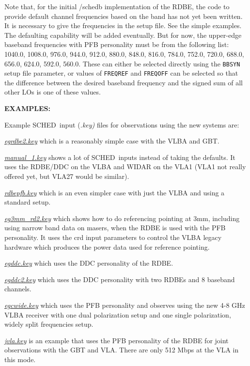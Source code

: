 \documentclass{report}
\newcommand{\schedb}{{\sc SCHED~}}
\begin{document}
Note that, for the initial /schedb implementation of the RDBE, the
code to provide default channel frequencies based on the band has not
yet been written.  It is necessary to give the frequencies in the
setup file.  See the simple examples.  The defaulting capability will
be added eventually.  But for now, the upper-edge baseband frequencies
with PFB personality must be from the following list: 1040.0, 1008.0,
976.0, 944.0, 912.0, 880.0, 848.0, 816.0, 784.0, 752.0, 720.0, 688.0,
656.0, 624.0, 592.0, 560.0.  These can either be selected directly
using the {\tt BBSYN} setup file parameter, or values of {\tt FREQREF}
and {\tt FREQOFF} can be selected so that the difference between the
desired baseband frequency and the signed sum of all other LOs is one
of these values.

{\bf EXAMPLES:}

Example \schedb input {(\sl .key)} files for observations using the
new systems are: 

{\href{examples/egrdbe2.key}{{\sl egrdbe2.key}}} which is
a reasonably simple case with the VLBA and GBT.

{\href{examples/manual\_1.key}{{\sl manual\_1.key}}} shows
a lot of \schedb inputs instead of taking the defaults.  It uses
the RDBE/DDC on the VLBA and WIDAR on the VLA1 (VLA1 not really offered
yet, but VLA27 would be similar).

{\href{examples/rdbepfb.key}{{\sl rdbepfb.key}}} which is
an even simpler case with just the VLBA and using a standard setup.

{\href{examples/eg3mm\_rd2.key}{{\sl eg3mm\_rd2.key}}} which
shows how to do referencing pointing at 3mm, including using narrow
band data on masers, when the RDBE is used with the PFB personality.
It uses the crd input parameters to control the VLBA legacy hardware
which produces the power data used for reference pointing.

{\href{examples/egddc.key}{{\sl egddc.key}}} which uses the
DDC personality of the RDBE.

{\href{examples/egddc2.key}{{\sl egddc2.key}}} which uses the
DDC personality with two RDBEs and 8 baseband channels.

{\href{examples/egcwide.key}{{\sl egcwide.key}}} which uses the
PFB personality and observes using the new 4-8 GHz VLBA receiver with
one dual polarization setup and one single polarization, widely 
split frequencies setup.

{\href{examples/jvla.key}{{\sl jvla.key}}} is an example
that uses the PFB personality of the RDBE for joint observations
with the GBT and VLA.  There are only 512 Mbps at the VLA in this 
mode.
\end{document}
